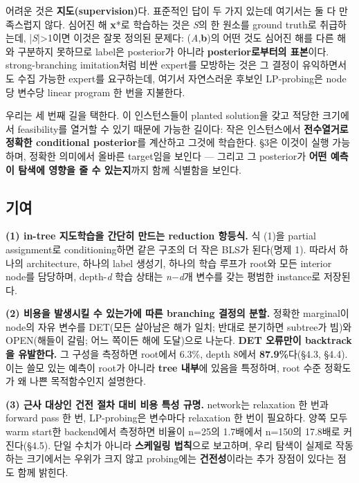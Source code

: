 \documentclass[final,5p,twocolumn]{elsarticle}
\begin{document}
어려운 것은 \textbf{지도(supervision)}다. 표준적인 답이 두 가지 있는데 여기서는 둘 다 만족스럽지 않다. 심어진 해 \textbf{x}*로 학습하는 것은 \textit{S}의 한 원소를 ground truth로 취급하는데, |\textit{S}|>1이면 이것은 잘못 정의된 문제다: (\textit{A},\textbf{b})의 어떤 것도 심어진 해를 다른 해와 구분하지 못하므로 label은 posterior가 아니라 \textbf{posterior로부터의 표본}이다. strong-branching imitation처럼 비싼 expert를 모방하는 것은 그 결정이 유익하면서도 수집 가능한 expert를 요구하는데, 여기서 자연스러운 후보인 LP-probing은 node당 변수당 linear program 한 번을 지불한다.

우리는 세 번째 길을 택한다. 이 인스턴스들이 planted solution을 갖고 적당한 크기에서 feasibility를 열거할 수 있기 때문에 가능한 길이다: 작은 인스턴스에서 \textbf{전수열거로 정확한 conditional posterior}를 계산하고 그것에 학습한다. §3은 이것이 실행 가능하며, 정확한 의미에서 올바른 target임을 보인다 — 그리고 그 posterior가 \textbf{어떤 예측이 탐색에 영향을 줄 수 있는지}까지 함께 식별함을 보인다.

\subsection{기여}
\textbf{(1) in-tree 지도학습을 간단히 만드는 reduction 항등식.} 식 (1)을 partial assignment로 conditioning하면 같은 구조의 더 작은 BLS가 된다(명제 1). 따라서 하나의 architecture, 하나의 label 생성기, 하나의 학습 루프가 root와 모든 interior node를 담당하며, depth-\textit{d} 학습 상태는 \textit{n}−\textit{d}개 변수를 갖는 평범한 instance로 저장된다.

\textbf{(2) 비용을 발생시킬 수 있는가에 따른 branching 결정의 분할.} 정확한 marginal이 node의 자유 변수를 DET(모든 살아남은 해가 일치; 반대로 분기하면 subtree가 빔)와 OPEN(해들이 갈림; 어느 쪽이든 해에 도달)으로 나눈다. \textbf{DET 오류만이 backtrack을 유발한다.} 그 구성을 측정하면 root에서 6.3\%, depth 8에서 \textbf{87.9\%}다(§4.3, §4.4). 이는 쓸모 있는 예측이 root가 아니라 \textbf{tree 내부}에 있음을 특정하며, root 수준 정확도가 왜 나쁜 목적함수인지 설명한다.

\textbf{(3) 근사 대상인 건전 절차 대비 비용 특성 규명.} network는 relaxation 한 번과 forward pass 한 번, LP-probing은 변수마다 relaxation 한 번이 필요하다. 양쪽 모두 warm start한 backend에서 측정하면 비율이 n=25의 1.7배에서 n=150의 17.8배로 커진다(§4.5). 단일 수치가 아니라 \textbf{스케일링 법칙}으로 보고하며, 우리 탐색이 실제로 작동하는 크기에서는 우위가 크지 않고 probing에는 \textbf{건전성}이라는 추가 장점이 있다는 점도 함께 밝힌다.
\end{document}
